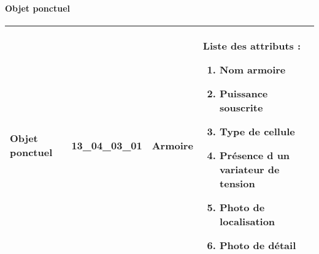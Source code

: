 \documentclass[12pt,titlepage]{book}
\begin{document}
\paragraph{Objet ponctuel}
\noindent
\vspace{\baselineskip}

\renewcommand{\arraystretch}{1.2}
\begin{supertabular}{|p{10cm}|c|p{13cm}|p{12cm}|}
 Objet ponctuel & 13\_04\_03\_01 & Armoire & Liste des attributs :
\begin{enumerate}
  \item Nom armoire  \item Puissance souscrite  \item Type de cellule  \item Présence d un variateur de tension  \item Photo de localisation  \item Photo de détail\end{enumerate}
\\
\hline
\end{supertabular}
\end{document}

